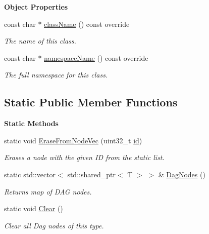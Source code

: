 \begin{Indent}\textbf{ Object Properties}\par
\begin{DoxyCompactItemize}
\item 
const char $\ast$ \mbox{\hyperlink{classrev_1_1_dag_node_ab769f5f1cc1bdb1dde07c8d1466fad56}{class\+Name}} () const override
\begin{DoxyCompactList}\small\item\em The name of this class. \end{DoxyCompactList}\item 
const char $\ast$ \mbox{\hyperlink{classrev_1_1_dag_node_a65d5289cdff9f83fde666474c33f4a5b}{namespace\+Name}} () const override
\begin{DoxyCompactList}\small\item\em The full namespace for this class. \end{DoxyCompactList}\end{DoxyCompactItemize}
\end{Indent}
\subsection*{Static Public Member Functions}
\begin{Indent}\textbf{ Static Methods}\par
\begin{DoxyCompactItemize}
\item 
\mbox{\label{classrev_1_1_dag_node_ae5c4ceca24c2e7d49666bd204b6df1ee}} 
static void \mbox{\hyperlink{classrev_1_1_dag_node_ae5c4ceca24c2e7d49666bd204b6df1ee}{Erase\+From\+Node\+Vec}} (uint32\+\_\+t \mbox{\hyperlink{classrev_1_1_dag_node_affc1f6a97703f3187ad0159709bb0681}{id}})
\begin{DoxyCompactList}\small\item\em Erases a node with the given ID from the static list. \end{DoxyCompactList}\item 
\mbox{\label{classrev_1_1_dag_node_a0e0ba53b2bb58c57e3dfbc3bc8203622}} 
static std\+::vector$<$ std\+::shared\+\_\+ptr$<$ T $>$ $>$ \& \mbox{\hyperlink{classrev_1_1_dag_node_a0e0ba53b2bb58c57e3dfbc3bc8203622}{Dag\+Nodes}} ()
\begin{DoxyCompactList}\small\item\em Returns map of D\+AG nodes. \end{DoxyCompactList}\item 
\mbox{\label{classrev_1_1_dag_node_af826eda4cef3c5bf895f4d0014198f37}} 
static void \mbox{\hyperlink{classrev_1_1_dag_node_af826eda4cef3c5bf895f4d0014198f37}{Clear}} ()
\begin{DoxyCompactList}\small\item\em Clear all Dag nodes of this type. \end{DoxyCompactList}\end{DoxyCompactItemize}
\end{Indent}
